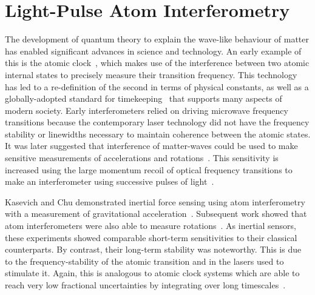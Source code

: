 \section{Light-Pulse Atom Interferometry}
The development of quantum theory to explain the wave-like behaviour
of matter has enabled significant advances in science and technology.
An early example of this is the atomic clock~\cite{ESSEN1955}, which makes use of the
interference between two atomic internal states to precisely measure
their transition frequency. This technology has led to a
re-definition of the second in terms of physical constants, as well as
a globally-adopted standard for timekeeping~\cite{Levine} that supports many aspects
of modern society. Early interferometers relied on driving microwave
frequency transitions because the contemporary laser technology did
not have the frequency stability or linewidths necessary to maintain coherence
between the atomic states. It was later
suggested that interference of matter-waves could be used to make
sensitive measurements of accelerations and
rotations~\cite{Clauser1988}. This sensitivity is increased using the large momentum
recoil of optical frequency transitions to make an interferometer
using successive pulses of light~\cite{Borde1989}.\par\noindent
Kasevich and Chu demonstrated inertial force sensing using atom
interferometry with a measurement of gravitational acceleration~\cite{Kasevich1991,Kasevich1992}. 
Subsequent work showed that atom interferometers were also able to
measure rotations~\cite{Durfee2006,Dubetsky2006}. As inertial sensors, these
experiments showed comparable short-term sensitivities to their
classical counterparts. By contrast, their long-term stability was
noteworthy. This is due to the frequency-stability of the atomic
transition and in the lasers used to stimulate it. Again, this is
analogous to atomic clock systems which are able to reach very low
fractional uncertainties by integrating over long
timescales~\cite{Borde2002}. 
